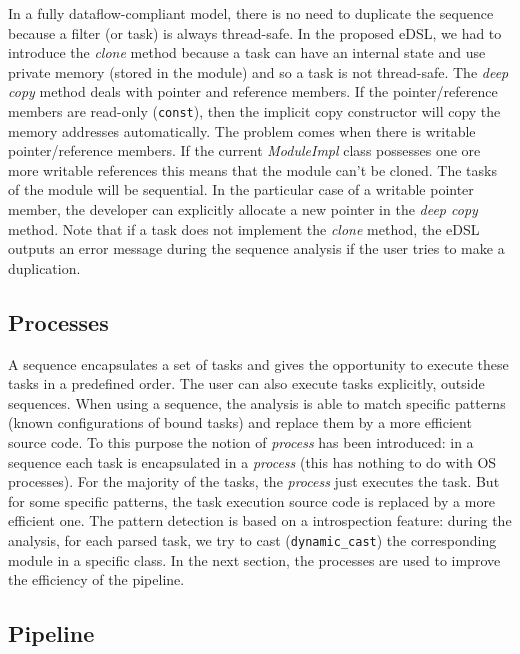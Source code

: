 In a fully dataflow-compliant model, there is no need to duplicate the sequence
because a filter (or task) is always thread-safe. In the proposed eDSL, we had
to introduce the \emph{clone} method because a task can have an internal state
and use private memory (stored in the module) and so a task is not thread-safe.
The \emph{deep copy} method deals with pointer and reference members. If the
pointer/reference members are read-only (\verb|const|), then the implicit copy
constructor will copy the memory addresses automatically. The problem comes
when there is writable pointer/reference members. If the current
\emph{ModuleImpl} class possesses one ore more writable references this means
that the module can't be cloned. The tasks of the module will be sequential. In
the particular case of a writable pointer member, the developer can explicitly
allocate a new pointer in the \emph{deep copy} method. Note that if a task does
not implement the \emph{clone} method, the eDSL outputs an error message during
the sequence analysis if the user tries to make a duplication.

\subsection{Processes}

A sequence encapsulates a set of tasks and gives the opportunity to execute
these tasks in a predefined order. The user can also execute tasks explicitly,
outside sequences. When using a sequence, the analysis is able to match specific
patterns (known configurations of bound tasks) and replace them by a more
efficient source code. To this purpose the notion of \emph{process} has been
introduced: in a sequence each task is encapsulated in a \emph{process} (this
has nothing to do with OS processes). For the majority of the tasks, the
\emph{process} just executes the task. But for some specific patterns, the task
execution source code is replaced by a more efficient one. The pattern detection
is based on a \Cxx introspection feature: during the analysis, for each parsed
task, we try to cast (\verb|dynamic_cast|) the corresponding module in a
specific class. In the next section, the processes are used to improve the
efficiency of the pipeline.

\newpage
\subsection{Pipeline}

